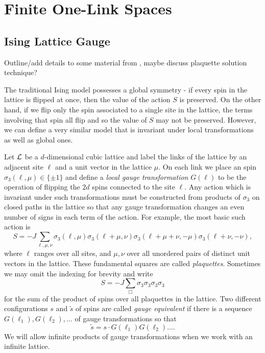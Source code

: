 \documentclass[10pt,reqno]{amsart}
\numberwithin{equation}{section}
\begin{document}
	\section{Finite One-Link Spaces}
	\subsection{Ising Lattice Gauge}
	
	Outline/add details to some material from \cite{KogutGaugeSummary}, maybe discuss \cite{MuellerJohnstonJanke17} plaquette solution technique?
	
	The traditional Ising model possesses a global symmetry - if every spin in the lattice is flipped at once, then the value of the action $S$ is preserved.
	On the other hand, if we flip only the spin associated to a single site in the lattice, the terms involving that spin all flip and so the value of $S$ may not be preserved.
	However, we can define a very similar model that is invariant under local transformations as well as global ones.
	
	Let $\mathcal{L}$ be a $d$-dimensional cubic lattice and label the links of the lattice by an adjacent site $\ell$ and a unit vector in the lattice $\mu$. 
	On each link we place an spin $\sigma_3(\ell,\mu)\in \{\pm 1\}$ and define a \emph{local gauge transformation} $G(\ell)$ to be the operation of flipping the $2d$ spins connected to the site $\ell$.
	Any action which is invariant under such transformations must be constructed from products of $\sigma_3$ on closed paths in the lattice so that any gauge transformation changes an even number of signs in each term of the action.
	For example, the most basic such action is 
		\[S=-J\sum_{\ell,\mu,\nu}\sigma_3(\ell,\mu)\sigma_3(\ell+\mu,\nu)\sigma_3(\ell+\mu+\nu,-\mu)\sigma_3(\ell+\nu,-\nu), \]
	where $\ell$ ranges over all sites, and $\mu,\nu$ over all unordered pairs of distinct unit vectors in the lattice.
	These fundamental squares are called \emph{plaquettes}.
	Sometimes we may omit the indexing for brevity and write
		\[S=-J\sum_{\Box} \sigma_3\sigma_3\sigma_3\sigma_3 \]
	for the sum of the product of spins over all plaquettes in the lattice. 
	Two different configurations $s$ and $\tilde{s}$ of spins are called \emph{gauge equivalent} if there is a sequence $G(\ell_1),G(\ell_2),\ldots$ of gauge transformations so that 
		\[ \tilde{s}=s\cdot G(\ell_1)G(\ell_2)\ldots. \]
	We will allow infinite products of gauge transformations when we work with an infinite lattice.
	
\end{document}

